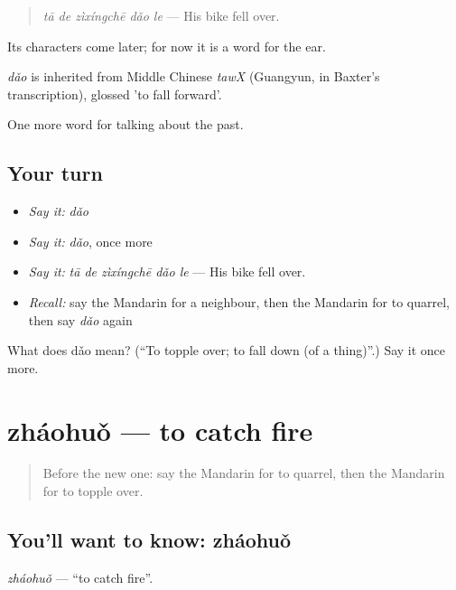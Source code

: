 \begin{quote}
\emph{tā de zìxíngchē dǎo le} — His bike fell over.
\end{quote}

Its characters come later; for now it is a word for the ear.

\begin{cousinweb}
\emph{dǎo} is inherited from Middle Chinese \emph{tawX} (Guangyun, in Baxter's transcription), glossed 'to fall forward'.
\end{cousinweb}

\begin{grammarlens}[title={What you've built}]
One more word for talking about the past.
\end{grammarlens}

\subsection*{Your turn}
\begin{itemize}
\raggedright
  \item \emph{Say it:} \emph{dǎo}
  \item \emph{Say it:} \emph{dǎo}, once more
  \item \emph{Say it:} \emph{tā de zìxíngchē dǎo le} — His bike fell over.
  \item \emph{Recall:} say the Mandarin for a neighbour, then the Mandarin for to quarrel, then say \emph{dǎo} again
\end{itemize}

\begin{tcolorbox}[breakable,colback=teal!4,colframe=teal!35!black,title={Before you move on}]
What does dǎo mean? (\textquotedblleft{}To topple over; to fall down (of a thing)\textquotedblright{}.) Say it once more.
\end{tcolorbox}
\section[zháohuǒ]{zháohuǒ — to catch fire}

\label{lesson:ZH-C176-zhaohuo}



\begin{quote}
Before the new one: say the Mandarin for to quarrel, then the Mandarin for to topple over.
\end{quote}

\subsection*{You'll want to know: zháohuǒ}
\emph{zháohuǒ} — \textquotedblleft{}to catch fire\textquotedblright{}.

